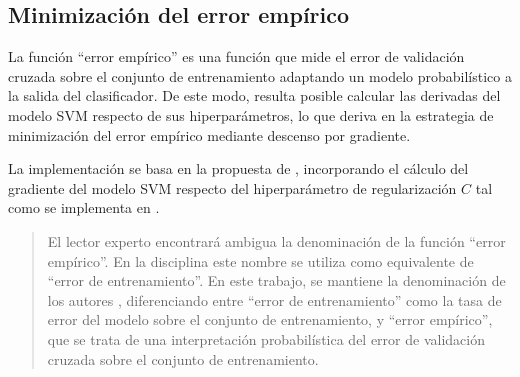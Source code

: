 %
%
\subsection{Minimización del error empírico}
%
La función ``error empírico'' es una función que mide el error de
validación cruzada sobre el conjunto de entrenamiento adaptando un
modelo probabilístico a la salida del clasificador. De este modo,
resulta posible calcular las derivadas del modelo SVM respecto de sus
hiperparámetros, lo que deriva en la estrategia de minimización del
error empírico mediante descenso por gradiente.

La implementación se basa en la propuesta de \cite{ayat}, incorporando
el cálculo del gradiente del modelo SVM respecto del hiperparámetro de
regularización $C$ \cite{keerthi,glasmachers} tal como se implementa
en \cite{shark}.
%
\begin{quote}
  El lector experto encontrará ambigua la denominación de la función
  ``error empírico''.  En la disciplina este nombre se utiliza como
  equivalente de ``error de entrenamiento''.  En este trabajo, se
  mantiene la denominación de los autores \cite{ayat}, diferenciando
  entre ``error de entrenamiento'' como la tasa de error del modelo
  sobre el conjunto de entrenamiento, y ``error empírico'', que se
  trata de una interpretación probabilística del error de validación
  cruzada sobre el conjunto de entrenamiento.
\end{quote}
%
